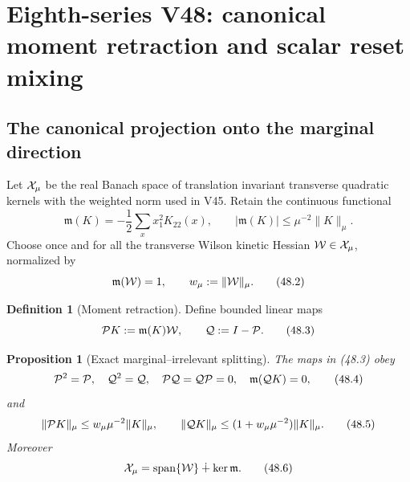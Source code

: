 \documentclass[11pt,oneside]{book}
\newtheorem{proposition}[theorem]{Proposition}
\theoremstyle{definition}
\newtheorem{definition}[theorem]{Definition}
\theoremstyle{remark}
\begin{document}


\section{Eighth-series V48: canonical moment retraction and scalar
reset mixing}
\label{sec:e8v48}

\subsection{The canonical projection onto the marginal direction}

Let \({\cal X}_\mu\) be the real Banach space of translation
invariant transverse quadratic kernels with the weighted norm used
in V45.  Retain the continuous functional
\[
 {\mathfrak m}(K)=-\frac12\sum_xx_1^2K_{22}(x),\qquad
 |{\mathfrak m}(K)|\le\mu^{-2}\|K\|_\mu.                      \tag{48.1}
\]
Choose once and for all the transverse Wilson kinetic Hessian
\({\cal W}\in{\cal X}_\mu\), normalized by
\[
 {\mathfrak m}({\cal W})=1,\qquad
 w_\mu:=\|{\cal W}\|_\mu.                                    \tag{48.2}
\]

\begin{definition}[Moment retraction]
\label{def:e8v48-moment-retraction}
Define bounded linear maps
\[
 {\cal P}K:={\mathfrak m}(K){\cal W},\qquad
 {\cal Q}:=I-{\cal P}.                                       \tag{48.3}
\]
\end{definition}

\begin{proposition}[Exact marginal--irrelevant splitting]
\label{prop:e8v48-splitting}
The maps in (48.3) obey
\[
 {\cal P}^2={\cal P},\quad {\cal Q}^2={\cal Q},\quad
 {\cal P}{\cal Q}={\cal Q}{\cal P}=0,\quad
 {\mathfrak m}({\cal Q}K)=0,                                 \tag{48.4}
\]
and
\[
 \|{\cal P}K\|_\mu\le w_\mu\mu^{-2}\|K\|_\mu,\qquad
 \|{\cal Q}K\|_\mu
 \le(1+w_\mu\mu^{-2})\|K\|_\mu.                              \tag{48.5}
\]
Moreover
\[
 {\cal X}_\mu
 =\operatorname{span}\{{\cal W}\}
  \mathbin{\dotplus}\ker{\mathfrak m}.                        \tag{48.6}
\]
\end{proposition}
\end{document}
